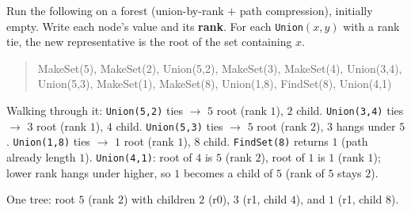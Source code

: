 \documentclass[11pt]{article}
\begin{document}
\begin{exambox}
Run the following on a forest (union-by-rank $+$ path compression), initially empty. Write each node's value and its \textbf{rank}. For each \texttt{Union}$(x,y)$ with a rank tie, the new representative is the root of the set containing $x$.
\begin{quote}\ttfamily
MakeSet(5), MakeSet(2), Union(5,2), MakeSet(3), MakeSet(4), Union(3,4),\\
Union(5,3), MakeSet(1), MakeSet(8), Union(1,8), FindSet(8), Union(4,1)
\end{quote}

\begin{answerband}
Walking through it: \texttt{Union(5,2)} ties $\to$ $5$ root (rank $1$), $2$ child. \texttt{Union(3,4)} ties $\to$ $3$ root (rank $1$), $4$ child. \texttt{Union(5,3)} ties $\to$ $5$ root (rank $2$), $3$ hangs under $5$. \texttt{Union(1,8)} ties $\to$ $1$ root (rank $1$), $8$ child. \texttt{FindSet(8)} returns $1$ (path already length $1$). \texttt{Union(4,1)}: root of $4$ is $5$ (rank $2$), root of $1$ is $1$ (rank $1$); lower rank hangs under higher, so $1$ becomes a child of $5$ (rank of $5$ stays $2$).

\begin{center}
\end{center}
One tree: root $5$ (rank $2$) with children $2$ (r0), $3$ (r1, child $4$), and $1$ (r1, child $8$).
\end{answerband}
\end{exambox}
\end{document}
